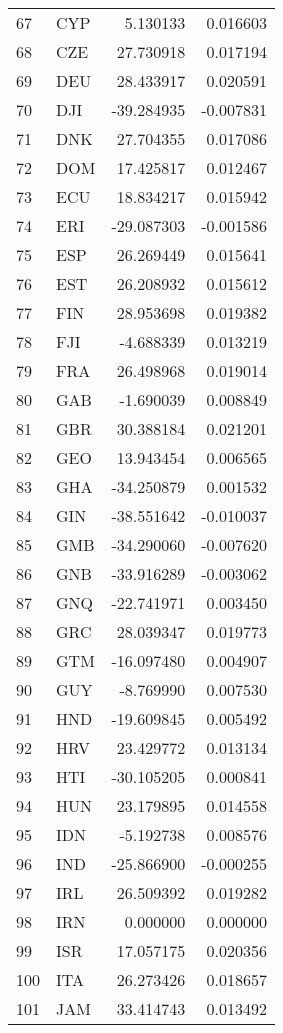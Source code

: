 \begin{tabular}{llrr}
67 & CYP & 5.130133 & 0.016603 \\
68 & CZE & 27.730918 & 0.017194 \\
69 & DEU & 28.433917 & 0.020591 \\
70 & DJI & -39.284935 & -0.007831 \\
71 & DNK & 27.704355 & 0.017086 \\
72 & DOM & 17.425817 & 0.012467 \\
73 & ECU & 18.834217 & 0.015942 \\
74 & ERI & -29.087303 & -0.001586 \\
75 & ESP & 26.269449 & 0.015641 \\
76 & EST & 26.208932 & 0.015612 \\
77 & FIN & 28.953698 & 0.019382 \\
78 & FJI & -4.688339 & 0.013219 \\
79 & FRA & 26.498968 & 0.019014 \\
80 & GAB & -1.690039 & 0.008849 \\
81 & GBR & 30.388184 & 0.021201 \\
82 & GEO & 13.943454 & 0.006565 \\
83 & GHA & -34.250879 & 0.001532 \\
84 & GIN & -38.551642 & -0.010037 \\
85 & GMB & -34.290060 & -0.007620 \\
86 & GNB & -33.916289 & -0.003062 \\
87 & GNQ & -22.741971 & 0.003450 \\
88 & GRC & 28.039347 & 0.019773 \\
89 & GTM & -16.097480 & 0.004907 \\
90 & GUY & -8.769990 & 0.007530 \\
91 & HND & -19.609845 & 0.005492 \\
92 & HRV & 23.429772 & 0.013134 \\
93 & HTI & -30.105205 & 0.000841 \\
94 & HUN & 23.179895 & 0.014558 \\
95 & IDN & -5.192738 & 0.008576 \\
96 & IND & -25.866900 & -0.000255 \\
97 & IRL & 26.509392 & 0.019282 \\
98 & IRN & 0.000000 & 0.000000 \\
99 & ISR & 17.057175 & 0.020356 \\
100 & ITA & 26.273426 & 0.018657 \\
101 & JAM & 33.414743 & 0.013492 \\

\end{tabular}
